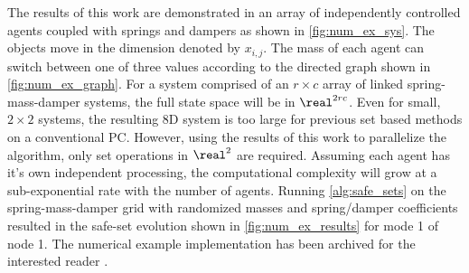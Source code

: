 The results of this work are demonstrated in an array of independently controlled agents coupled with springs and dampers as shown in \autoref{fig:num_ex_sys}. The objects move in the dimension denoted by $x_{i,j}$. The mass of each agent can switch between one of three values according to the directed graph shown in \autoref{fig:num_ex_graph}.  For a system comprised of an $r\times c$ array of linked spring-mass-damper systems, the full state space will be in $\real^{2rc}$. Even for small, $2\times 2$ systems, the resulting 8D system is  too large for previous set based methods on a conventional PC. However, using the results of this work to parallelize the algorithm, only set operations in $\real^2$ are required. Assuming each agent has it's own independent processing, the computational complexity will grow at a sub-exponential rate with the number of agents. Running \autoref{alg:safe_sets} on the spring-mass-damper grid with randomized masses and spring/damper coefficients resulted in the safe-set evolution shown in \autoref{fig:num_ex_results} for mode 1 of node 1. The numerical example implementation has been archived for the interested reader \cite{PaperSoftware}. 